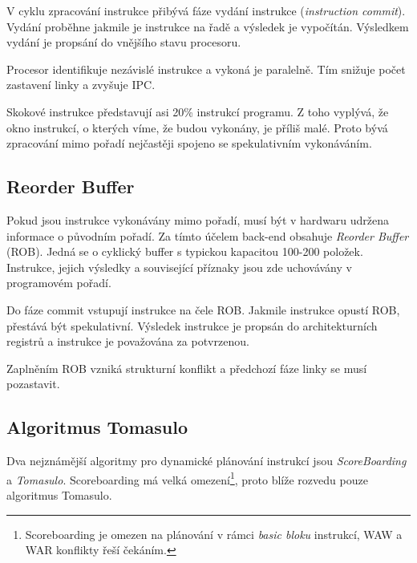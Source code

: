 V cyklu zpracování instrukce přibývá fáze vydání instrukce (\emph{instruction commit}).
Vydání proběhne jakmile je instrukce na řadě a výsledek je vypočítán.
Výsledkem vydání je propsání do vnějšího stavu procesoru.

Procesor identifikuje nezávislé instrukce a vykoná je paralelně.
Tím snižuje počet zastavení linky a zvyšuje IPC.

Skokové instrukce představují asi 20\% instrukcí programu.
Z toho vyplývá, že okno instrukcí, o kterých víme, že budou vykonány, je příliš malé.
Proto bývá zpracování mimo pořadí nejčastěji spojeno se spekulativním vykonáváním. 


\subsection{Reorder Buffer}

Pokud jsou instrukce vykonávány mimo pořadí, musí být v hardwaru udržena informace o původním pořadí.
Za tímto účelem back-end obsahuje \emph{Reorder Buffer} (ROB).
Jedná se o cyklický buffer s typickou kapacitou 100-200 položek.
Instrukce, jejich výsledky a související příznaky jsou zde uchovávány v programovém pořadí.

Do fáze commit vstupují instrukce na čele ROB.
Jakmile instrukce opustí ROB, přestává být spekulativní.
Výsledek instrukce je propsán do architekturních registrů a instrukce je považována za potvrzenou.

Zaplněním ROB vzniká strukturní konflikt a předchozí fáze linky se musí pozastavit.

\subsection{Algoritmus Tomasulo}

Dva nejznámější algoritmy pro dynamické plánování instrukcí jsou \emph{ScoreBoarding} a \emph{Tomasulo}.
Scoreboarding má velká omezení\footnote{Scoreboarding je omezen na plánování v rámci \emph{basic bloku} instrukcí, WAW a WAR konflikty řeší čekáním.}, proto blíže rozvedu pouze algoritmus Tomasulo.

